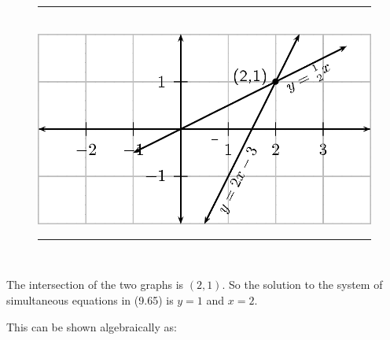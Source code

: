 	\begin{figure}[H] %
    \begin{center}
    \rule[.1in]{\figurerulewidth}{.005in} \\
        \label{m39257*uid96!!!underscore!!!media}\label{m39257*uid96!!!underscore!!!printimage}\includegraphics[width=.8\columnwidth]{col11306.imgs/m39257_MG10C10_006.png} %
      \vspace{2pt}
    \vspace{.1in}
    \rule[.1in]{\figurerulewidth}{.005in} \\
    \end{center}
 \end{figure}       
        \label{m39257*id159137}The intersection of the two graphs is $\left(2,1\right)$. So the solution to the system of simultaneous equations in (9.65) is $y=1$ and $x=2$.\par 
        \label{m39257*id159194}This can be shown algebraically as:\par 
        \label{m39257*id159197}\nopagebreak\noindent{}
